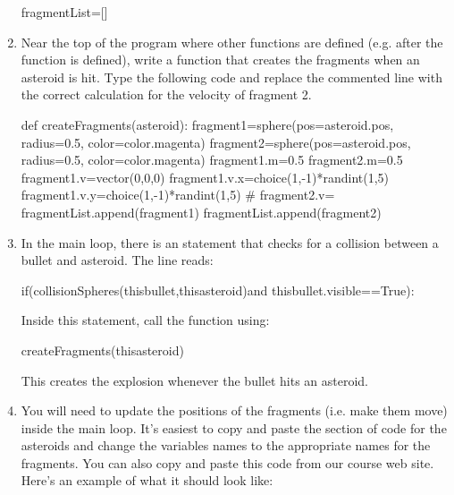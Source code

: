 \begin{enumerate}
\begin{myvpython}
fragmentList=[]
\end{myvpython}

\item Near the top of the program where other functions are defined (e.g. after the  function is defined), write a function that creates the fragments when an asteroid is hit. Type the following code and replace the commented line with the correct calculation for the velocity of fragment 2.

\begin{myvpython}
def createFragments(asteroid):
    fragment1=sphere(pos=asteroid.pos, radius=0.5, color=color.magenta)
    fragment2=sphere(pos=asteroid.pos, radius=0.5, color=color.magenta)
    fragment1.m=0.5
    fragment2.m=0.5
    fragment1.v=vector(0,0,0)
    fragment1.v.x=choice(1,-1)*randint(1,5)
    fragment1.v.y=choice(1,-1)*randint(1,5)
#    fragment2.v=
    fragmentList.append(fragment1)
    fragmentList.append(fragment2)   
\end{myvpython}

\item In the main  loop, there is an  statement that checks for a collision between a bullet and asteroid. The line reads:

\begin{myvpython}
if(collisionSpheres(thisbullet,thisasteroid)and thisbullet.visible==True):
\end{myvpython}

Inside this  statement, call the  function using:

\begin{myvpython}
                   createFragments(thisasteroid)
\end{myvpython}

This creates the explosion whenever the bullet hits an asteroid.

\item You will need to update the positions of the fragments (i.e. make them move) inside the main  loop. It's easiest to copy and paste the section of code for the asteroids and change the variables names to the appropriate names for the fragments. You can also copy and paste this code from our course web site. Here's an example of what it should look like:


\end{enumerate}
